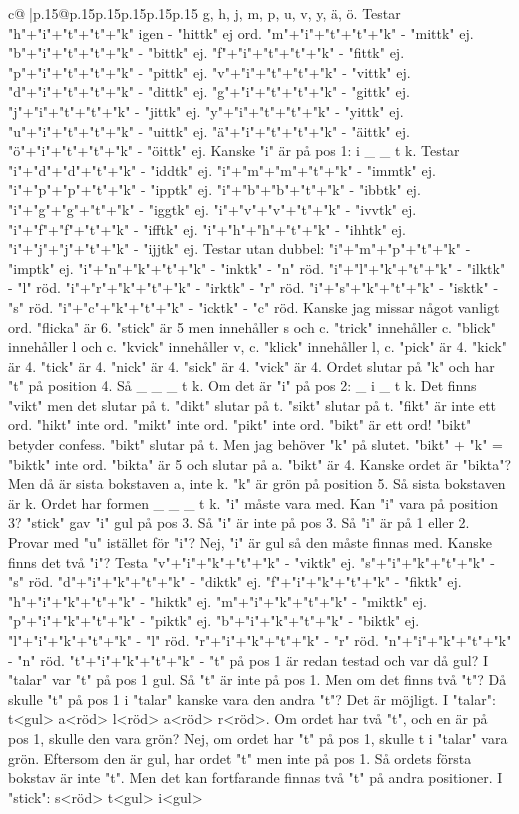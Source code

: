 \documentclass{article}
\begin{document}
{\begin{supertabular}{c@{$\;$}|p{.15\linewidth}@{}p{.15\linewidth}p{.15\linewidth}p{.15\linewidth}p{.15\linewidth}p{.15\linewidth}}
{{{g, h, j, m, p, u, v, y, ä, ö. Testar "h"+"i"+"t"+"t"+"k" igen {-} "hittk" ej ord. "m"+"i"+"t"+"t"+"k" {-} "mittk" ej. "b"+"i"+"t"+"t"+"k" {-} "bittk" ej. "f"+"i"+"t"+"t"+"k" {-} "fittk" ej. "p"+"i"+"t"+"t"+"k" {-} "pittk" ej. "v"+"i"+"t"+"t"+"k" {-} "vittk" ej. "d"+"i"+"t"+"t"+"k" {-} "dittk" ej. "g"+"i"+"t"+"t"+"k" {-} "gittk" ej. "j"+"i"+"t"+"t"+"k" {-} "jittk" ej. "y"+"i"+"t"+"t"+"k" {-} "yittk" ej. "u"+"i"+"t"+"t"+"k" {-} "uittk" ej. "ä"+"i"+"t"+"t"+"k" {-} "äittk" ej. "ö"+"i"+"t"+"t"+"k" {-} "öittk" ej. Kanske "i" är på pos 1: i \_ \_ t k. Testar "i"+"d"+"d"+"t"+"k" {-} "iddtk" ej. "i"+"m"+"m"+"t"+"k" {-} "immtk" ej. "i"+"p"+"p"+"t"+"k" {-} "ipptk" ej. "i"+"b"+"b"+"t"+"k" {-} "ibbtk" ej. "i"+"g"+"g"+"t"+"k" {-} "iggtk" ej. "i"+"v"+"v"+"t"+"k" {-} "ivvtk" ej. "i"+"f"+"f"+"t"+"k" {-} "ifftk" ej. "i"+"h"+"h"+"t"+"k" {-} "ihhtk" ej. "i"+"j"+"j"+"t"+"k" {-} "ijjtk" ej. Testar utan dubbel: "i"+"m"+"p"+"t"+"k" {-} "imptk" ej. "i"+"n"+"k"+"t"+"k" {-} "inktk" {-} "n" röd. "i"+"l"+"k"+"t"+"k" {-} "ilktk" {-} "l" röd. "i"+"r"+"k"+"t"+"k" {-} "irktk" {-} "r" röd. "i"+"s"+"k"+"t"+"k" {-} "isktk" {-} "s" röd. "i"+"c"+"k"+"t"+"k" {-} "icktk" {-} "c" röd. Kanske jag missar något vanligt ord. "flicka" är 6. "stick" är 5 men innehåller s och c. "trick" innehåller c. "blick" innehåller l och c. "kvick" innehåller v, c. "klick" innehåller l, c. "pick" är 4. "kick" är 4. "tick" är 4. "nick" är 4. "sick" är 4. "vick" är 4. Ordet slutar på "k" och har "t" på position 4. Så \_ \_ \_ t k. Om det är "i" på pos 2: \_ i \_ t k. Det finns "vikt" men det slutar på t. "dikt" slutar på t. "sikt" slutar på t. "fikt" är inte ett ord. "hikt" inte ord. "mikt" inte ord. "pikt" inte ord. "bikt" är ett ord! "bikt" betyder confess. "bikt" slutar på t. Men jag behöver "k" på slutet. "bikt" + "k" = "biktk" inte ord. "bikta" är 5 och slutar på a. "bikt" är 4. Kanske ordet är "bikta"? Men då är sista bokstaven a, inte k. "k" är grön på position 5. Så sista bokstaven är k. Ordet har formen \_ \_ \_ t k. "i" måste vara med. Kan "i" vara på position 3? "stick" gav "i" gul på pos 3. Så "i" är inte på pos 3. Så "i" är på 1 eller 2. Provar med "u" istället för "i"? Nej, "i" är gul så den måste finnas med. Kanske finns det två "i"? Testa "v"+"i"+"k"+"t"+"k" {-} "viktk" ej. "s"+"i"+"k"+"t"+"k" {-} "s" röd. "d"+"i"+"k"+"t"+"k" {-} "diktk" ej. "f"+"i"+"k"+"t"+"k" {-} "fiktk" ej. "h"+"i"+"k"+"t"+"k" {-} "hiktk" ej. "m"+"i"+"k"+"t"+"k" {-} "miktk" ej. "p"+"i"+"k"+"t"+"k" {-} "piktk" ej. "b"+"i"+"k"+"t"+"k" {-} "biktk" ej. "l"+"i"+"k"+"t"+"k" {-} "l" röd. "r"+"i"+"k"+"t"+"k" {-} "r" röd. "n"+"i"+"k"+"t"+"k" {-} "n" röd. "t"+"i"+"k"+"t"+"k" {-} "t" på pos 1 är redan testad och var då gul? I "talar" var "t" på pos 1 gul. Så "t" är inte på pos 1. Men om det finns två "t"? Då skulle "t" på pos 1 i "talar" kanske vara den andra "t"? Det är möjligt. I "talar": t<gul> a<röd> l<röd> a<röd> r<röd>. Om ordet har två "t", och en är på pos 1, skulle den vara grön? Nej, om ordet har "t" på pos 1, skulle t i "talar" vara grön. Eftersom den är gul, har ordet "t" men inte på pos 1. Så ordets första bokstav är inte "t". Men det kan fortfarande finnas två "t" på andra positioner. I "stick": s<röd> t<gul> i<gul> }}}
\end{supertabular}}
\end{document}
